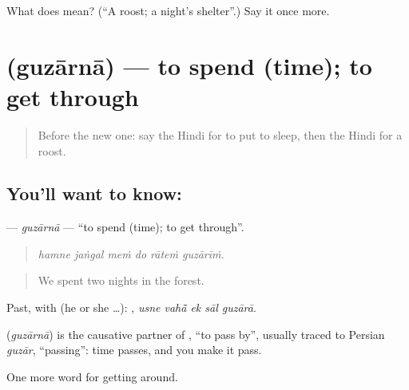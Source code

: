 \begin{tcolorbox}[breakable,colback=teal!4,colframe=teal!35!black,title={Before you move on}]
What does  mean? (\textquotedblleft{}A roost; a night's shelter\textquotedblright{}.) Say it once more.
\end{tcolorbox}
\section[\texorpdfstring{\hi{गुज़ारना} (guzārnā)}{गुज़ारना (guzārnā)}]{ (guzārnā) — to spend (time); to get through}

\label{lesson:HI-C416-guzaarna}



\begin{quote}
Before the new one: say the Hindi for to put to sleep, then the Hindi for a roost.
\end{quote}

\subsection*{You'll want to know: }
\textbf{} — \emph{guzārnā} — \textquotedblleft{}to spend (time); to get through\textquotedblright{}.

\begin{quote}
     
\end{quote}

\begin{quote}
\emph{hamne jaṅgal meṁ do rāteṁ guzārīṁ.}
\end{quote}

\begin{quote}
We spent two nights in the forest.
\end{quote}

Past, with  (he or she …):     , \emph{usne vahā̃ ek sāl guzārā}.

\begin{cousinweb}
\textbf{} (\emph{guzārnā}) is the causative partner of , \textquotedblleft{}to pass by\textquotedblright{}, usually traced to Persian \emph{guzār}, \textquotedblleft{}passing\textquotedblright{}: time passes, and you make it pass.
\end{cousinweb}

\begin{grammarlens}[title={What you've built}]
One more word for getting around.
\end{grammarlens}

